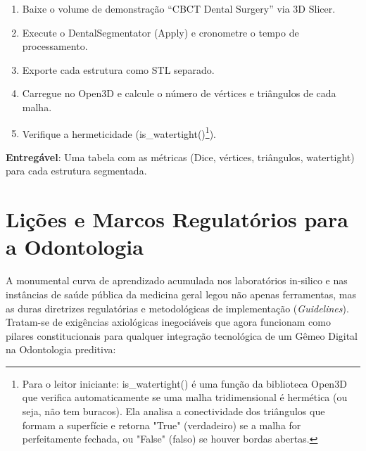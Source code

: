 \begin{enumerate}
    \item Baixe o volume de demonstração ``CBCT Dental Surgery'' via 3D Slicer.
    \item Execute o DentalSegmentator (Apply) e cronometre o tempo de processamento.
    \item Exporte cada estrutura como STL separado.
    \item Carregue no Open3D e calcule o número de vértices e triângulos de cada malha.
    \item Verifique a hermeticidade (is\_watertight()\footnote{Para o leitor iniciante: is\_watertight() é uma função da biblioteca Open3D que verifica automaticamente se uma malha tridimensional é hermética (ou seja, não tem buracos). Ela analisa a conectividade dos triângulos que formam a superfície e retorna "True" (verdadeiro) se a malha for perfeitamente fechada, ou "False" (falso) se houver bordas abertas.}).
\end{enumerate}

\textbf{Entregável}: Uma tabela com as métricas (Dice, vértices, triângulos, watertight) para cada estrutura segmentada.

\section{Lições e Marcos Regulatórios para a Odontologia}

A monumental curva de aprendizado acumulada nos laboratórios in-silico e nas instâncias de saúde pública da medicina geral legou não apenas ferramentas, mas as duras diretrizes regulatórias e metodológicas de implementação (\textit{Guidelines}). Tratam-se de exigências axiológicas inegociáveis que agora funcionam como pilares constitucionais para qualquer integração tecnológica de um Gêmeo Digital na Odontologia preditiva:

